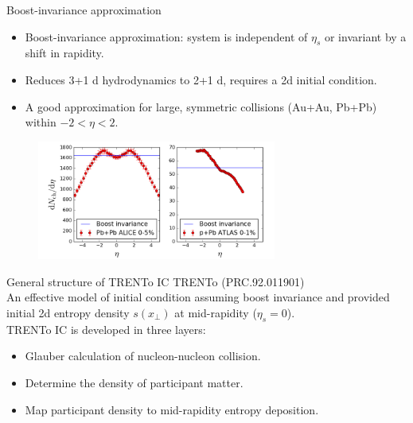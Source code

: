 \documentclass[11pt]{beamer}
\begin{document}
\begin{frame}{Boost-invariance approximation}
\begin{itemize}
\item Boost-invariance approximation: system is independent of $\eta_s$ or invariant by a shift in rapidity.
\item Reduces 3+1 d hydrodynamics to 2+1 d, requires a 2d initial condition.
\item A good approximation for large, symmetric collisions (Au+Au, Pb+Pb) within $-2 < \eta < 2$.
\end{itemize}
\begin{center}
\begin{figure}
\includegraphics[width=0.7\textwidth]{./pics/bi.png}
\end{figure}
\end{center}
\end{frame}

\begin{frame}{General structure of TRENTo IC}
TRENTo (PRC.92.011901)\\
An effective model of initial condition assuming boost invariance and provided initial 2d entropy density $s(x_\perp)$ at mid-rapidity ($\eta_s = 0$).
\\
TRENTo IC is developed in three layers:
\begin{itemize}
\item Glauber calculation of nucleon-nucleon collision.
\item Determine the density of participant matter.
\item Map participant density to mid-rapidity entropy deposition.
\end{itemize}
\end{frame}
\end{document}
